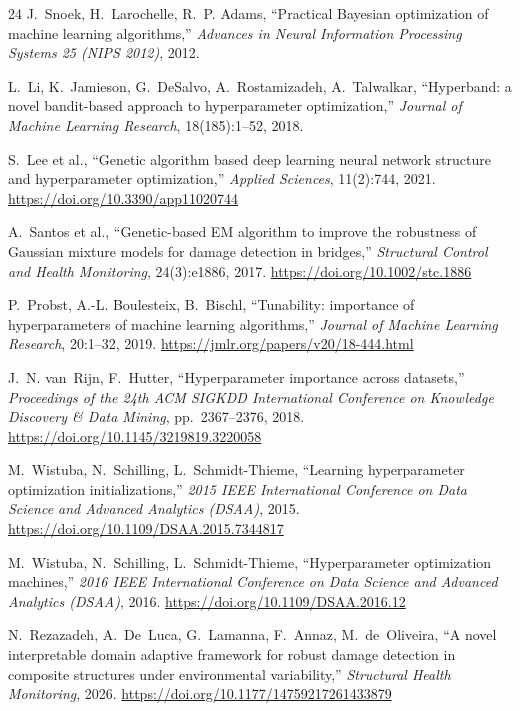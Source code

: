 \documentclass[11pt,a4paper]{article}
\begin{document}
\begin{thebibliography}{24}
J.~Snoek, H.~Larochelle, R.~P. Adams,
``Practical Bayesian optimization of machine learning algorithms,''
\emph{Advances in Neural Information Processing Systems 25 (NIPS 2012)}, 2012.

L.~Li, K.~Jamieson, G.~DeSalvo, A.~Rostamizadeh, A.~Talwalkar,
``Hyperband: a novel bandit-based approach to hyperparameter optimization,''
\emph{Journal of Machine Learning Research}, 18(185):1--52, 2018.

S.~Lee et al.,
``Genetic algorithm based deep learning neural network structure and hyperparameter optimization,''
\emph{Applied Sciences}, 11(2):744, 2021.
\url{https://doi.org/10.3390/app11020744}

A.~Santos et al.,
``Genetic-based EM algorithm to improve the robustness of Gaussian mixture models for damage detection in bridges,''
\emph{Structural Control and Health Monitoring}, 24(3):e1886, 2017.
\url{https://doi.org/10.1002/stc.1886}

P.~Probst, A.-L. Boulesteix, B.~Bischl,
``Tunability: importance of hyperparameters of machine learning algorithms,''
\emph{Journal of Machine Learning Research}, 20:1--32, 2019.
\url{https://jmlr.org/papers/v20/18-444.html}

J.~N. van~Rijn, F.~Hutter,
``Hyperparameter importance across datasets,''
\emph{Proceedings of the 24th ACM SIGKDD International Conference on Knowledge Discovery \& Data Mining}, pp.~2367--2376, 2018.
\url{https://doi.org/10.1145/3219819.3220058}

M.~Wistuba, N.~Schilling, L.~Schmidt-Thieme,
``Learning hyperparameter optimization initializations,''
\emph{2015 IEEE International Conference on Data Science and Advanced Analytics (DSAA)}, 2015.
\url{https://doi.org/10.1109/DSAA.2015.7344817}

M.~Wistuba, N.~Schilling, L.~Schmidt-Thieme,
``Hyperparameter optimization machines,''
\emph{2016 IEEE International Conference on Data Science and Advanced Analytics (DSAA)}, 2016.
\url{https://doi.org/10.1109/DSAA.2016.12}

N.~Rezazadeh, A.~De~Luca, G.~Lamanna, F.~Annaz, M.~de~Oliveira,
``A novel interpretable domain adaptive framework for robust damage detection in composite structures under environmental variability,''
\emph{Structural Health Monitoring}, 2026.
\url{https://doi.org/10.1177/14759217261433879}


\end{thebibliography}
\end{document}
